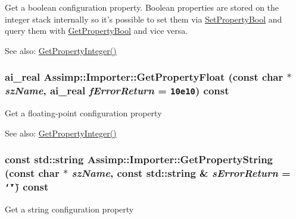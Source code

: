 Get a boolean configuration property. Boolean properties are stored on the integer stack internally so it's possible to set them via \hyperlink{class_assimp_1_1_importer_4af22a88eddf464d949a761149c72825}{SetPropertyBool} and query them with \hyperlink{class_assimp_1_1_importer_90f5d35d25e5d2a0ef8bc0c6545b2010}{GetPropertyBool} and vice versa. \begin{Desc}
\item[See also:]\hyperlink{class_assimp_1_1_importer_3e796a0758a9f10f13107f44c542ad41}{GetPropertyInteger()} \end{Desc}
\hypertarget{class_assimp_1_1_importer_dfe1387ccc837fd59bf620e8216637fa}{
\subsubsection[GetPropertyFloat]{\setlength{\rightskip}{0pt plus 5cm}ai\_\-real Assimp::Importer::GetPropertyFloat (const char $\ast$ {\em szName}, \/  ai\_\-real {\em fErrorReturn} = {\tt 10e10}) const}}
\label{class_assimp_1_1_importer_dfe1387ccc837fd59bf620e8216637fa}


Get a floating-point configuration property \begin{Desc}
\item[See also:]\hyperlink{class_assimp_1_1_importer_3e796a0758a9f10f13107f44c542ad41}{GetPropertyInteger()} \end{Desc}
\hypertarget{class_assimp_1_1_importer_a31cc1aa8f83056fe097b149354ddfd3}{
\subsubsection[GetPropertyString]{\setlength{\rightskip}{0pt plus 5cm}const std::string Assimp::Importer::GetPropertyString (const char $\ast$ {\em szName}, \/  const std::string \& {\em sErrorReturn} = {\tt \char`\"{}\char`\"{}}) const}}
\label{class_assimp_1_1_importer_a31cc1aa8f83056fe097b149354ddfd3}


Get a string configuration property

